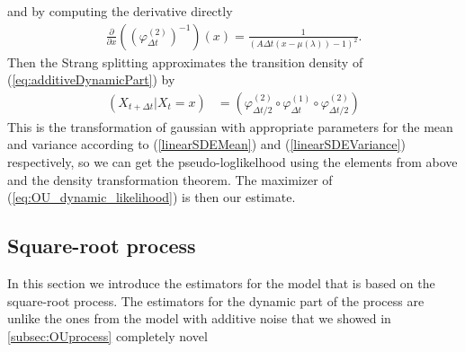 and by computing the derivative directly
\begin{align}
    \frac{\partial}{\partial x} \left(\left(\varphi^{(2)}_{\Delta t}\right)^{-1}\right)(x) = \frac{1}{\left(A \Delta t\left(x-\mu\left(\lambda \right)\right) - 1\right)^2}.
\end{align}
Then the Strang splitting approximates the transition density of (\ref{eq:additiveDynamicPart}) by
\begin{align}
    \left(X_{t + \Delta t} | X_t = x\right) &= \left(\varphi^{(2)}_{\Delta t / 2}\circ \varphi^{(1)}_{\Delta t} \circ \varphi^{(2)}_{\Delta t / 2}\right) \label{eq:OU_dynamic_likelihood}
\end{align}
This is the transformation of gaussian with appropriate parameters for the mean and variance according to (\ref{linearSDEMean}) and (\ref{linearSDEVariance}) respectively, so we can get the pseudo-loglikelhood using the elements from above and the density transformation theorem. The maximizer of (\ref{eq:OU_dynamic_likelihood}) is then our estimate. 
\subsection{Square-root process}\label{subsec:squareroot}
In this section we introduce the estimators for the model that is based on the square-root process. The estimators for the dynamic part of the process are unlike the ones from the model with additive noise that we showed in \ref{subsec:OUprocess} completely novel
